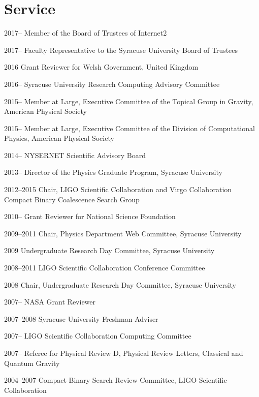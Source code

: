\documentclass{cv}
\begin{document}
\section{Service}
\begin{entry}
\item[2017--] {Member of the Board of Trustees of Internet2}
\item[2017--] {Faculty Representative to the Syracuse University Board of Trustees}
\item[2016] {Grant Reviewer for Welsh Government, United Kingdom}
\item[2016--] {Syracuse University Research Computing Advisory Committee}
\item[2015--] {Member at Large, Executive Committee of the Topical Group in Gravity, American Physical Society}
\item[2015--] {Member at Large, Executive Committee of the Division of Computational Physics, American Physical Society}
\item[2014--] {NYSERNET Scientific Advisory Board}
\item[2013--] {Director of the Physics Graduate Program, Syracuse University}
\item[2012--2015] {Chair, LIGO Scientific Collaboration and Virgo Collaboration
Compact Binary Coalescence Search Group}
\item[2010--] {Grant Reviewer for National Science Foundation}
\item[2009--2011] {Chair, Physics Department Web Committee, Syracuse University}
\item[2009] {Undergraduate Research Day Committee, Syracuse University}
\item[2008--2011] {LIGO Scientific Collaboration Conference Committee}
\item[2008] {Chair, Undergraduate Research Day Committee, Syracuse University}
\item[2007--] {NASA Grant Reviewer}
\item[2007--2008] {Syracuse University Freshman Adviser}
\item[2007--] {LIGO Scientific Collaboration Computing Committee}
\item[2007--] {Referee for Physical Review D, Physical Review Letters, Classical and Quantum Gravity}
\item[2004--2007] {Compact Binary Search Review Committee, LIGO Scientific Collaboration}
\end{entry}
\end{document}
